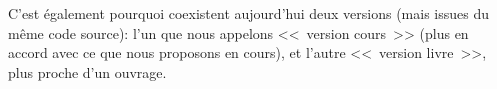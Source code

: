 \documentclass[11pt,pdflatex]{book}
\begin{document}
C'est également pourquoi coexistent aujourd'hui deux versions (mais issues du même code source):
l'un que nous appelons <<~version cours~>> (plus en accord avec ce que nous proposons en cours),
et l'autre <<~version livre~>>, plus proche d'un ouvrage.

%
%


\tableofcontents%


%
%



% 
% 
% 
% 
% 
% 

% 
% 
\end{document}

